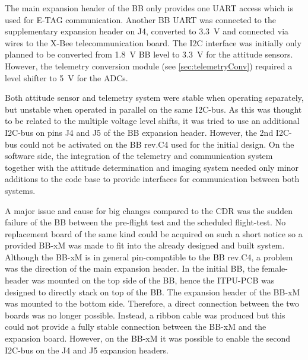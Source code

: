 The main expansion header of the \ac{BB} only provides one \ac{UART} access which is used for \ac{E-TAG} communication. Another \ac{BB} UART was connected to the supplementary expansion header on J4, converted to 3.3~V and connected via wires to the X-Bee telecommunication board. The \ac{I2C} interface was initially only planned to be converted from 1.8~V \ac{BB} level to 3.3~V for the attitude sensors. However, the telemetry conversion module (see \ref{sec:telemetryConv}) required a level shifter to 5~V for the ADCs. 

Both attitude sensor and telemetry system were stable when operating separately, but unstable when operated in parallel on the same I2C-bus. As this was thought to be related to the multiple voltage level shifts, it was tried to use an additional I2C-bus on pins J4 and J5 of the \ac{BB} expansion header. However, the 2nd I2C-bus could not be activated on the BB rev.C4 used for the initial design.
On the software side, the integration of the telemetry and communication system together with the attitude determination and imaging system needed only minor additions to the code base to provide interfaces for communication between both systems. 

A major issue and cause for big changes compared to the CDR was the sudden failure of the BB between the pre-flight test and the scheduled flight-test. No replacement board of the same kind could be acquired on such a short notice so a provided BB-xM was made to fit into the already designed and built system. Although the BB-xM is in general pin-compatible to the BB rev.C4, a problem was the direction of the main expansion header. In the initial BB, the female-header was mounted on the top side of the BB, hence the ITPU-PCB was designed to directly stack on top of the BB. The expansion header of the BB-xM was mounted to the bottom side. Therefore, a direct connection between the two boards was no longer possible. Instead, a ribbon cable was produced but this could not provide a fully stable connection between the BB-xM and the expansion board. However, on the BB-xM it was possible to enable the second I2C-bus on the J4 and J5 expansion headers.
